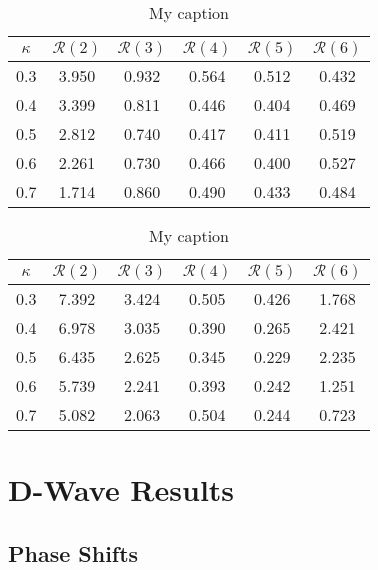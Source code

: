 \documentclass[Dissertation.tex]{subfiles}
\begin{document}
\begin{table}[h]
\centering
\begin{tabular}{cccccc}
\toprule
$\kappa$ & $\mathcal{R}(2)$ & $\mathcal{R}(3)$ & $\mathcal{R}(4)$ & $\mathcal{R}(5)$ & $\mathcal{R}(6)$ \\
\midrule
0.3 & 3.950 & 0.932 & 0.564 & 0.512 & 0.432 \\
0.4 & 3.399 & 0.811 & 0.446 & 0.404 & 0.469 \\
0.5 & 2.812 & 0.740 & 0.417 & 0.411 & 0.519 \\
0.6 & 2.261 & 0.730 & 0.466 & 0.400 & 0.527 \\
0.7 & 1.714 & 0.860 & 0.490 & 0.433 & 0.484 \\
\bottomrule
\end{tabular}
\caption{My caption}
\label{my-label}
\end{table}

\begin{table}[h]
\centering
\begin{tabular}{cccccc}
\toprule
$\kappa$ & $\mathcal{R}(2)$ & $\mathcal{R}(3)$ & $\mathcal{R}(4)$ & $\mathcal{R}(5)$ & $\mathcal{R}(6)$ \\
\midrule
0.3 & 7.392 & 3.424 & 0.505 & 0.426 & 1.768 \\
0.4 & 6.978 & 3.035 & 0.390 & 0.265 & 2.421 \\
0.5 & 6.435 & 2.625 & 0.345 & 0.229 & 2.235 \\
0.6 & 5.739 & 2.241 & 0.393 & 0.242 & 1.251 \\
0.7 & 5.082 & 2.063 & 0.504 & 0.244 & 0.723 \\
\bottomrule
\end{tabular}
\caption{My caption}
\label{my-label}
\end{table}



\section{D-Wave Results}
\label{sec:DWaveResults}

\subsection{Phase Shifts}
\label{sec:DWavePhase}
\end{document}
